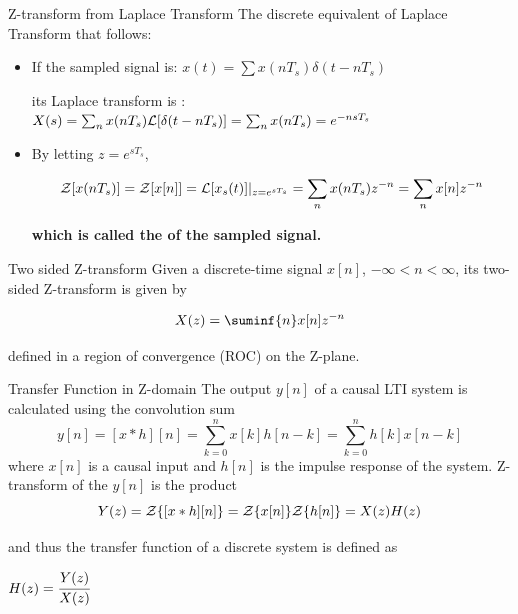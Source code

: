\documentclass[aspectratio=169,xcolor=dvipsnames,svgnames,x11names,fleqn]{beamer}
\begin{document}
\begin{frame}{Z-transform from Laplace Transform}
    The discrete equivalent of Laplace Transform that follows:
\begin{itemize}
    \item If the sampled signal is: $x(t) = \sum x(nT_s)\delta(t-nT_s)$
  
    its Laplace transform is : $X(s) = \sum_{n} x(nT_s) {\mathcal L}[\delta(t - nT_s)] = \sum_n x(nT_s) = e^{-ns T_s}$

    \item By letting $z = e^{sT_s}$, 

$$
{\mathcal Z} [ x(nT_s)] ={\mathcal Z} [ x[n]] = {\mathcal L}[x_s(t)]|_{z = e^{sT_s}} = \sum_{n} x(nT_s) z^{-n} = \sum_{n} x[n] z^{-n}
$$

\textbf{which is called the {\color{red}{Z-transform}} of the sampled signal.}

    
\end{itemize}

\end{frame}

\begin{frame}{Two sided Z-transform}
    Given a discrete-time signal $x[n]$, $ -\infty <n< \infty$, its two-sided Z-transform is given by

    $$
    X(z) = \suminf{n} x[n]z^{-n}
    $$

    defined in a region of convergence (ROC) on the Z-plane.
    
\end{frame}

\begin{frame}{Transfer Function in Z-domain}
    The output $y[n]$ of a causal LTI system is calculated using the convolution sum
    $$
    y[n] = [x*h][n] = \sum_{k = 0}^n x[k]h[n-k] =  \sum_{k = 0}^n h[k]x[n-k]
    $$
    where $x[n]$ is a causal input and $h[n]$ is the impulse response of the system.  Z-transform of the $y[n]$ is the product
    $$
    Y(z) = {\mathcal Z}\{ [x*h][n] \} = {\mathcal Z}\{ x[n] \} {\mathcal Z}\{ h[n] \} = X(z) H(z)
    $$

    and thus the transfer function of a discrete system is defined as

    \begin{gradgreen}
    \begin{center}
        $H(z) = \cfrac{Y(z)}{X(z)}$    
    \end{center}
    \end{gradgreen}
    
\end{frame}
\end{document}
